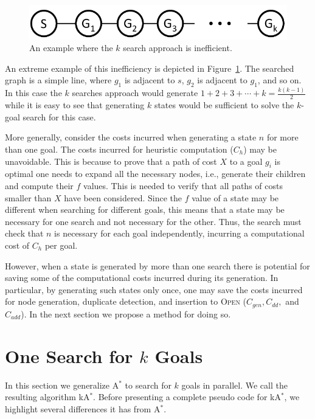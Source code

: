\documentclass{aicom2e}
\newcommand{\kgs}{$k$-goal search}
\newcommand{\astar}{A$^*$}
\newcommand{\kastar}{kA$^*$}
\newcommand{\open}{\textsc{Open}}
\begin{document}
\begin{figure}
	\includegraphics[width=\columnwidth]{k-search-bad_cropped}
	\caption{An example where the $k$ search approach is inefficient.}
	\label{fig:k-search-bad}
\end{figure}
An extreme example of this inefficiency is depicted in Figure~\ref{fig:k-search-bad}. The searched graph is a simple line, 
where $g_1$ is adjacent to $s$, $g_2$ is adjacent to $g_1$, and so on. In this case the $k$ searches approach would generate
$1+2+3+\cdots+k=\frac{k(k-1)}{2}$ while it is easy to see that generating $k$ states would be sufficient to solve the \kgs{} for this case. 


More generally, consider the costs incurred when generating a state $n$ for more than one goal. 
The costs incurred for heuristic computation ($C_{h}$) may be unavoidable. This is because to prove that a path of cost $X$ to a goal $g_i$ is optimal one needs to expand all the necessary nodes, i.e., generate their children and compute their $f$ values. This is needed to verify that all paths of costs smaller than $X$ have been considered. Since the $f$ value of a state may be different when searching for different goals, this means that a state may be necessary for one search and not necessary for the other. 
Thus, the search must check that $n$ is necessary for each goal independently, incurring a computational cost of $C_{h}$ per goal. 



However, when a state is generated by more than one search there is potential for saving some of the computational costs incurred during its generation. In particular, by generating such states only once, one may save the costs incurred for node generation, duplicate detection, and insertion to \open{} ($C_{gen}, C_{dd},$ and $C_{add}$). In the next section we propose a method for doing so. 



\section{One Search for $k$ Goals}
In this section we generalize \astar{} to search for $k$ goals in parallel. 
We call the resulting algorithm \kastar{}. 
Before presenting a complete pseudo code for \kastar{}, we highlight several differences it has from \astar{}. 
\end{document}
